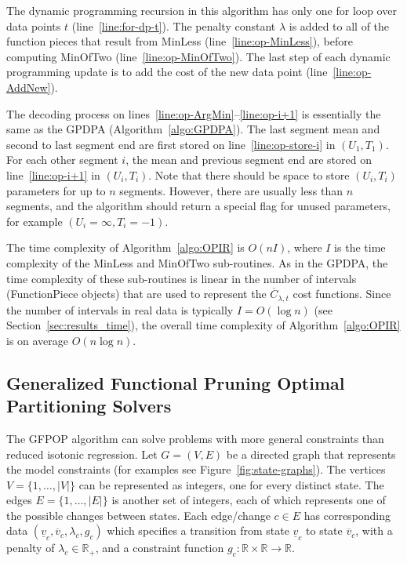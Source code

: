 \documentclass[article]{jss}
\newcommand{\RR}{\mathbb R}
\begin{document}
The dynamic programming recursion in this algorithm has only one for
loop over data points $t$ (line~\ref{line:for-dp-t}). The penalty
constant $\lambda$ is added to all of the function pieces that result
from MinLess (line~\ref{line:op-MinLess}), before computing MinOfTwo
(line~\ref{line:op-MinOfTwo}). The last step of each dynamic
programming update is to add the cost of the new data point
(line~\ref{line:op-AddNew}).

The decoding process on lines~\ref{line:op-ArgMin}--\ref{line:op-i+1}
is essentially the same as the GPDPA (Algorithm~\ref{algo:GPDPA}). The
last segment mean and second to last segment end are first stored on
line~\ref{line:op-store-i} in $(U_1,T_1)$. For each other segment $i$,
the mean and previous segment end are stored on line~\ref{line:op-i+1}
in $(U_i,T_i)$. Note that there should be space to store $(U_i,T_i)$
parameters for up to $n$ segments. However, there are usually less
than $n$ segments, and the algorithm should return a special flag for
unused parameters, for example $(U_i=\infty, T_i=-1)$.

The time complexity of Algorithm~\ref{algo:OPIR} is $O(n I)$, where
$I$ is the time complexity of the MinLess and MinOfTwo
sub-routines. As in the GPDPA, the time complexity of these
sub-routines is linear in the number of intervals (FunctionPiece
objects) that are used to represent the $\overline C_{\lambda, t}$
cost functions. Since the number of intervals in real data is
typically $I=O(\log n)$ (see Section~\ref{sec:results_time}), the
overall time complexity of Algorithm~\ref{algo:OPIR} is on average
$O(n \log n)$.

\subsection{Generalized Functional Pruning Optimal Partitioning
  Solvers}
\label{sec:GFPOP}

The GFPOP algorithm can solve problems with more general constraints
than reduced isotonic regression. Let $G=(V,E)$ be a directed graph
that represents the model constraints (for examples see
Figure~\ref{fig:state-graphs}). The vertices $V=\{1,\dots,|V|\}$ can be
represented as integers, one for every distinct state. The edges
$E=\{1,\dots,|E|\}$ is another set of integers, each of which represents
one of the possible changes between states. Each edge/change $c\in E$
has corresponding data
$(\underline v_c, \overline v_c, \lambda_c, g_c)$ which specifies a
transition from state $\underline v_c$ to state $\overline v_c$, with
a penalty of $\lambda_c\in\RR_+$, and a constraint function
$g_c:\RR\times\RR\rightarrow\RR$.
\end{document}
